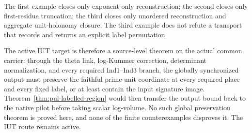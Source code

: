 The first example closes only exponent-only reconstruction; the second closes
only first-residue truncation; the third closes only unordered reconstruction
and aggregate unit-holonomy closure.  The third example does not refute a
transport that records and returns an explicit label permutation.

The active IUT target is therefore a source-level theorem on the actual common
carrier: through the theta link, log-Kummer correction, determinant
normalization, and every required Ind1--Ind3 branch, the globally synchronized
output must preserve the faithful prime-unit coordinate at every required
place and every fixed label, or at least contain the input signature image.
Theorem~\ref{thm:pul-labelled-region} would then transfer the output bound
back to the native pilot before taking scalar log-volume.  No such global
preservation theorem is proved here, and none of the finite counterexamples
disproves it.  The IUT route remains active.
